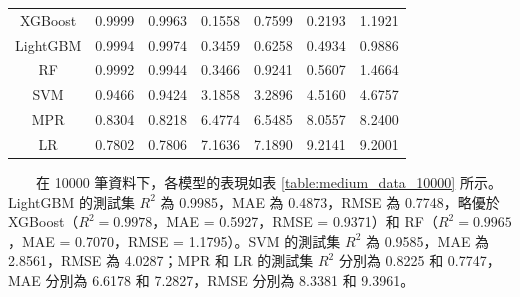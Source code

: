\documentclass[12pt,a4paper]{article}
\begin{document}
\begin{enumerate}
\begin{enumerate}[label=\arabic*.]
\begin{enumerate}[label=3-2-\arabic*.]
\begin{enumerate}[label=\Alph*.]
\begin{table}[H]
\begin{tabular}{|c|c|c|c|c|c|c|}
                                \hline
                                XGBoost & 0.9999 & 0.9963 & 0.1558 & 0.7599 & 0.2193 & 1.1921 \\
                                LightGBM & 0.9994 & 0.9974 & 0.3459 & 0.6258 & 0.4934 & 0.9886 \\
                                RF & 0.9992 & 0.9944 & 0.3466 & 0.9241 & 0.5607 & 1.4664 \\
                                SVM & 0.9466 & 0.9424 & 3.1858 & 3.2896 & 4.5160 & 4.6757 \\
                                MPR & 0.8304 & 0.8218 & 6.4774 & 6.5485 & 8.0557 & 8.2400 \\
                                LR & 0.7802 & 0.7806 & 7.1636 & 7.1890 & 9.2141 & 9.2001 \\
                                \hline
                            \end{tabular}
                        \end{table}
                    　　在 10000 筆資料下，各模型的表現如表 \ref{table:medium_data_10000} 所示。LightGBM 的測試集 \( R^2 \) 為 0.9985，MAE 為 0.4873，RMSE 為 0.7748，略優於 XGBoost（\( R^2 = 0.9978 \)，MAE = 0.5927，RMSE = 0.9371）和 RF（\( R^2 = 0.9965 \)，MAE = 0.7070，RMSE = 1.1795）。SVM 的測試集 \( R^2 \) 為 0.9585，MAE 為 2.8561，RMSE 為 4.0287；MPR 和 LR 的測試集 \( R^2 \) 分別為 0.8225 和 0.7747，MAE 分別為 6.6178 和 7.2827，RMSE 分別為 8.3381 和 9.3961。\\


\end{enumerate}
\end{enumerate}
\end{enumerate}
\end{enumerate}
\end{document}
